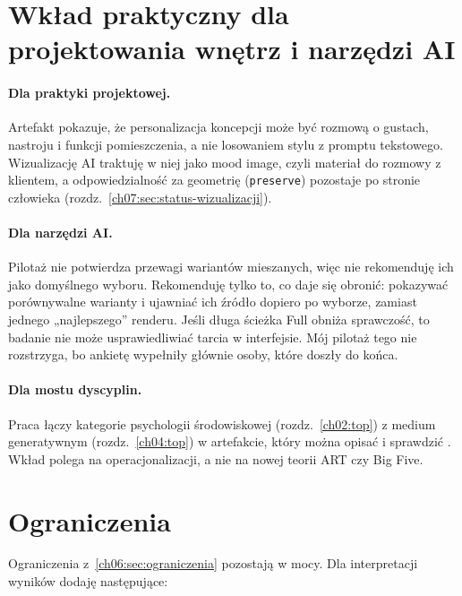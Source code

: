 \section{Wkład praktyczny dla projektowania wnętrz i narzędzi AI}
\label{ch09:sec:praktyka}

\paragraph{Dla praktyki projektowej.}
Artefakt pokazuje, że personalizacja koncepcji może być rozmową o gustach, nastroju i funkcji pomieszczenia, a nie losowaniem stylu z promptu tekstowego. Wizualizację AI traktuję w niej jako mood image, czyli materiał do rozmowy z klientem, a odpowiedzialność za geometrię (\texttt{preserve}) pozostaje po stronie człowieka (rozdz.~\ref{ch07:sec:status-wizualizacji}).

\paragraph{Dla narzędzi AI.}
Pilotaż nie potwierdza przewagi wariantów mieszanych, więc nie rekomenduję ich jako domyślnego wyboru. Rekomenduję tylko to, co daje się obronić: pokazywać porównywalne warianty i ujawniać ich źródło dopiero po wyborze, zamiast jednego „najlepszego” renderu. Jeśli długa ścieżka Full obniża sprawczość, to badanie nie może usprawiedliwiać tarcia w interfejsie. Mój pilotaż tego nie rozstrzyga, bo ankietę wypełniły głównie osoby, które doszły do końca.

\paragraph{Dla mostu dyscyplin.}
Praca łączy kategorie psychologii środowiskowej (rozdz.~\ref{ch02:top}) z medium generatywnym (rozdz.~\ref{ch04:top}) w artefakcie, który można opisać i sprawdzić \parencite{idaPlatform2026}. Wkład polega na operacjonalizacji, a nie na nowej teorii ART czy Big Five.

\section{Ograniczenia}
\label{ch09:sec:ograniczenia}

Ograniczenia z~\cref{ch06:sec:ograniczenia} pozostają w mocy. Dla interpretacji wyników dodaję następujące:

